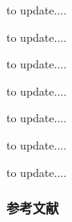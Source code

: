 
\begin{frame}

to update....

\end{frame}


\begin{frame}

to update....

\end{frame}


\begin{frame}

to update....

\end{frame}


\begin{frame}

to update....

\end{frame}


\begin{frame}

to update....

\end{frame}


\begin{frame}

to update....

\end{frame}


\begin{frame}

to update....

\end{frame}


\begin{frame}[allowframebreaks]
\frametitle{参考文献}

{\footnotesize


}

\end{frame}


